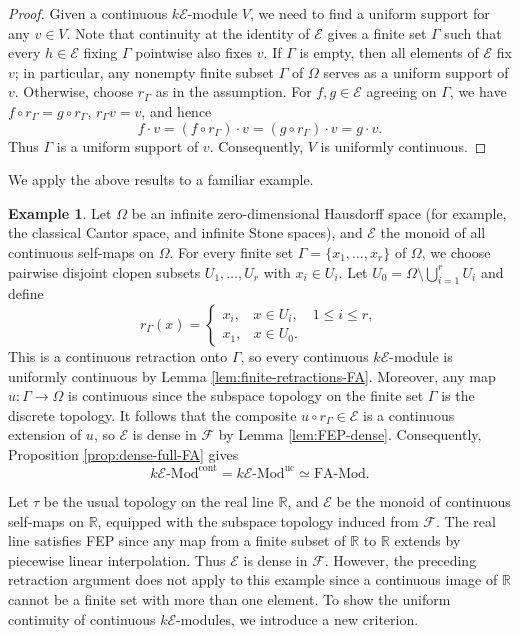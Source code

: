 \documentclass[10pt, reqno]{amsart}
\theoremstyle{plain}
\numberwithin{equation}{section}
\theoremstyle{definition}
\newtheorem{example}[theorem]{Example}
\newcommand{\Mod}{{\textrm{-}\mathrm{Mod}}}
\newcommand{\FA}{\mathrm{FA}}
\newcommand{\E}{\mathscr E}
\begin{document}
\begin{proof}
Given a continuous $k\E$-module $V$, we need to find a uniform support for any $v \in V$. Note that continuity at the identity of $\E$ gives a finite set $\Gamma$ such that every $h \in \E$ fixing $\Gamma$ pointwise also fixes $v$. If $\Gamma$ is empty, then all elements of $\E$ fix $v$; in particular, any nonempty finite subset $\Gamma$ of $\Omega$ serves as a uniform support of $v$. Otherwise, choose $r_\Gamma$ as in the assumption. For $f, g \in \E$ agreeing on $\Gamma$, we have $f \circ r_\Gamma = g\circ r_\Gamma$, $r_\Gamma v = v$, and hence
\[
  f \cdot v = (f \circ r_\Gamma) \cdot v = (g \circ r_\Gamma) \cdot v = g \cdot v.
\]
Thus $\Gamma$ is a uniform support of $v$. Consequently, $V$ is uniformly continuous.
\end{proof}

We apply the above results to a familiar example.

\begin{example}\label{ex:cantor-FA}
Let $\Omega$ be an infinite zero-dimensional Hausdorff space (for example, the classical Cantor space, and infinite Stone spaces), and $\E$ the monoid of all continuous self-maps on $\Omega$. For every finite set $\Gamma = \{x_1, \ldots, x_r\}$ of $\Omega$, we choose pairwise disjoint clopen subsets $U_1, \ldots, U_r$ with $x_i \in U_i$. Let $U_0 = \Omega \setminus \bigcup_{i=1}^r U_i$ and define
\[
  r_\Gamma(x)=
  \begin{cases}
    x_i, & x \in U_i, \quad 1 \leqslant i \leqslant r,\\
    x_1, & x \in U_0.
  \end{cases}
\]
This is a continuous retraction onto $\Gamma$, so every continuous $k\E$-module is uniformly continuous by Lemma \ref{lem:finite-retractions-FA}. Moreover, any map $u: \Gamma \to \Omega$ is continuous since the subspace topology on the finite set $\Gamma$ is the discrete topology. It follows that the composite $u \circ r_{\Gamma} \in \E$ is a continuous extension of $u$, so $\E$ is dense in $\mathscr{F}$ by Lemma \ref{lem:FEP-dense}. Consequently, Proposition \ref{prop:dense-full-FA} gives
\[
  k\E \Mod^{\mathrm{cont}} = k\E \Mod^{\mathrm{uc}} \simeq\FA\Mod.
\]
\end{example}

Let $\tau$ be the usual topology on the real line $\mathbb{R}$, and $\E$ be the monoid of continuous self-maps on $\mathbb{R}$, equipped with the subspace topology induced from $\mathscr{F}$. The real line satisfies FEP since any map from a finite subset of $\mathbb R$ to $\mathbb R$ extends by piecewise linear interpolation. Thus $\E$ is dense in $\mathscr{F}$. However, the preceding retraction argument does not apply to this example since a continuous image of $\mathbb R$ cannot be a finite set with more than one element. To show the uniform continuity of continuous $k\E$-modules, we introduce a new criterion.
\end{document}
